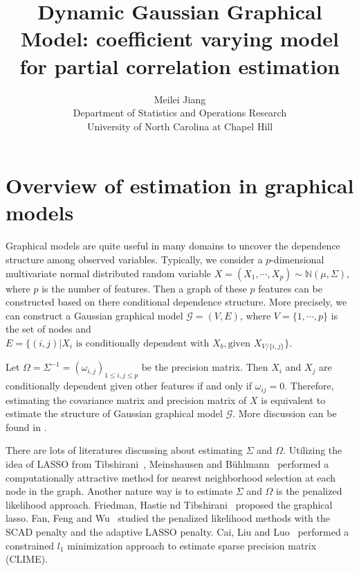 \documentclass[11pt]{article}
\begin{document}
\author{Meilei Jiang\\
    Department of Statistics and Operations Research\\
		University of North Carolina at Chapel Hill}
\title{Dynamic Gaussian Graphical Model: coefficient varying model for partial correlation estimation}

\maketitle

\section{Overview of estimation in graphical models}

Graphical models are quite useful  in many domains to uncover the dependence structure among observed variables. Typically, we consider a $p$-dimensional multivariate normal distributed random variable $ X = (X_1, \cdots, X_p) \sim \mathbb{N}(\mu, \Sigma) $, where $p$ is the number of features. Then a graph of these $p$ features can be constructed based on there conditional dependence structure. More precisely, we can construct a Gaussian graphical model $\mathcal{G} = (V, E)$, where $V = \{ 1, \cdots, p\}$ is the set of nodes and $E = \{ (i, j) | X_i \text{ is conditionally dependent with } X_b, \text{given } X_{V/\{i, j\}}\}$.     

Let $\Omega = \Sigma^{-1} = (\omega_{i,j})_{1\leq i, j \leq p}$ be the precision matrix. Then $X_i$ and $X_j$ are conditionally dependent given other features if and only if $\omega_{ij} = 0$. Therefore, estimating the covariance matrix and precision matrix of $X$ is equivalent to estimate the structure of Gaussian graphical model $\mathcal{G}$. More discussion can be found in \cite{lauritzen1996graphical}.

There are lots of literatures discussing about estimating $\Sigma$ and $\Omega$. Utilizing the idea of LASSO from Tibshirani~\cite{tibshirani1996regression}, Meinshausen and B{\"u}hlmann~\cite{meinshausen2006high} performed a computationally attractive method for nearest neighborhood selection at each node in the graph. Another nature way is to estimate $\Sigma$ and $\Omega$ is the penalized likelihood approach. Friedman, Hastie nd Tibshirani~\cite{friedman2008sparse} proposed the graphical lasso. Fan, Feng and Wu~\cite{fan2009network} studied the penalized likelihood methods with the SCAD penalty and the adaptive LASSO penalty. Cai, Liu and Luo~\cite{cai2011constrained} performed a constrained $l_1$ minimization approach to estimate sparse precision matrix (CLIME). 
\end{document}
